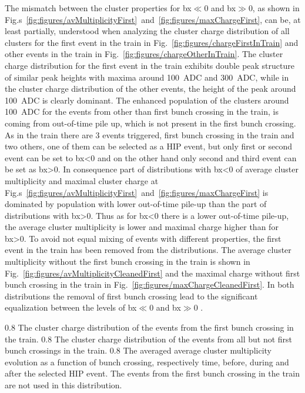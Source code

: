 The mismatch between the cluster properties for bx$\ll$0 and bx$\gg$0, as shown in Fig.s~\ref{fig:figures/avMultiplicityFirst}~and~\ref{fig:figures/maxChargeFirst}, can be, at least partially, understood when analyzing the cluster charge distribution of all clusters for the first event in the train in Fig.~\ref{fig:figures/chargeFirstInTrain} and other events in the train in Fig.~\ref{fig:figures/chargeOtherInTrain}. The cluster charge distribution for the first event in the train exhibits double peak structure of similar peak heights with maxima around 100~ADC and 300~ADC, while in the cluster charge distribution of the other events, the height of the peak around 100~ADC is clearly dominant. The enhanced population of the clusters around 100~ADC for the events from other than first bunch crossing in the train, is coming from out-of-time pile up, which is not present in the first bunch crossing. As in the train there are 3 events triggered, first bunch crossing in the train and two others, one of them can be selected as a HIP event, but only first or second event can be set to bx<0 and on the other hand only second and third event can be set as bx>0. In consequence part of distributions with bx<0 of average cluster multiplicity and maximal cluster charge at Fig.s~\ref{fig:figures/avMultiplicityFirst}~and~\ref{fig:figures/maxChargeFirst} is dominated by population with lower out-of-time pile-up than the part of distributions with bx>0. Thus as for bx<0 there is a lower out-of-time pile-up, the average cluster multiplicity is lower and maximal charge higher than for bx>0. To avoid not equal mixing of events with different properties, the first event in the train has been removed from the distributions. The average cluster multiplicity without the first bunch crossing in the train is shown in Fig.~\ref{fig:figures/avMultiplicityCleanedFirst} and the maximal charge without first bunch crossing in the train in Fig.~\ref{fig:figures/maxChargeCleanedFirst}. In both distributions the removal of first bunch crossing lead to the significant equalization between the levels of bx$\ll$0 and bx$\gg$0 .

                 {0.8}       %
                 {The cluster charge distribution of the events from the first bunch crossing in the train. } %
                 {0.8}       %
                 {The cluster charge distribution of the events from all but not first bunch crossings in the train. } %
                 {0.8}       %
                 {The averaged average cluster multiplicity evolution as a function of bunch crossing, respectively time, before, during and after the selected HIP event. The events from the first bunch crossing in the train are not used in this distribution. } %


